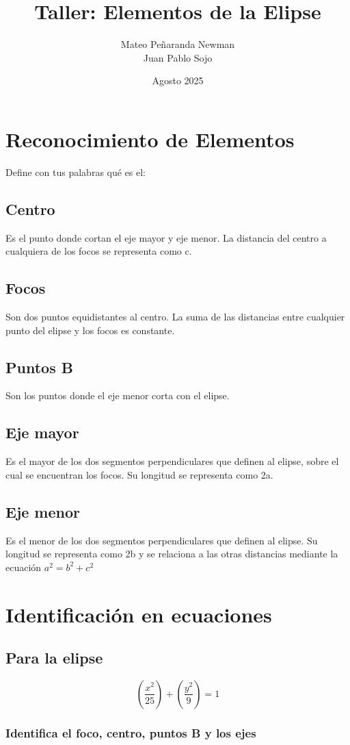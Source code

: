 \documentclass{article}
\begin{document}
\title{Taller: Elementos de la Elipse}
\author{Mateo Peñaranda Newman \\ Juan Pablo Sojo}
\date{Agosto 2025}
\maketitle

\section{Reconocimiento de Elementos}
Define con tus palabras qué es el:
\subsection{Centro}
Es el punto donde cortan el eje mayor y eje menor. La distancia del centro a cualquiera de los focos se representa como c.
\subsection{Focos}
Son dos puntos equidistantes al centro. La suma de las distancias entre cualquier punto del elipse y los focos es constante.
\subsection{Puntos B}
Son los puntos donde el eje menor corta con el elipse.
\subsection{Eje mayor}
Es el mayor de los dos segmentos perpendiculares que definen al elipse, sobre el cual se encuentran los focos. Su longitud se representa como 2a.
\subsection{Eje menor}
Es el menor de los dos segmentos perpendiculares que definen al elipse. Su longitud se representa como 2b y se relaciona a las otras distancias mediante la ecuación $a^2=b^2+c^2$

\section{Identificación en ecuaciones}
\subsection{Para la elipse}
$$(\frac{x^2}{25})+(\frac{y^2}{9})=1$$
\subsubsection{Identifica el foco, centro, puntos B y los ejes}
\begin{equation}
    \begin{aligned}
        
    \end{aligned}
\end{equation}
\end{document}
